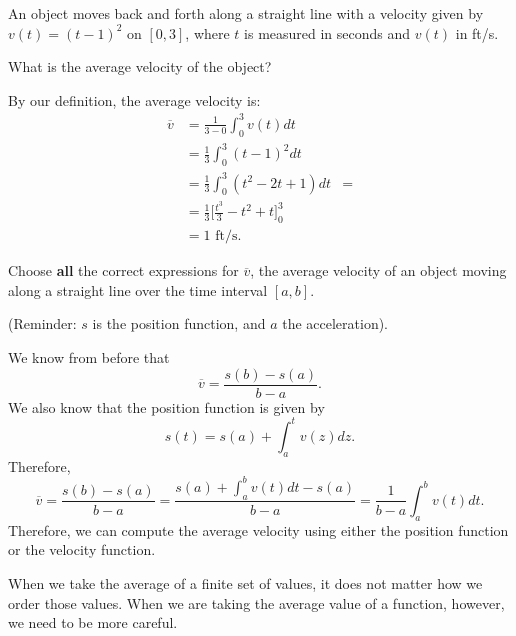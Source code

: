\documentclass{ximera}
\begin{document}
\begin{example}
An object moves back and forth along a straight line with a velocity
given by $v(t) = (t-1)^2$ on $[0,3]$, where $t$ is measured in seconds
and $v(t)$ in ft/s.

What is the average velocity of the object?
\begin{explanation}
By our definition, the average velocity is:
\begin{align*}
\overline{v}&=\frac{1}{3-0}\int_0^3v(t) dt\\
&=\frac{1}{3}\int_0^3 (t-1)^2 dt \\
&=\frac13 \int_0^3 (t^2-2t+1) dt&=\\
&= \frac13\bigg[ \frac{t^3}{3}-t^2+t \bigg]_0^3\\
&= 1\text{ ft/s}.
\end{align*}
\end{explanation}
\end{example}
\begin{question}
Choose \textbf{all} the correct expressions for $\overline{v}$, the average velocity of an object moving along a straight line over the time interval $[a,b]$.

(Reminder: $s$ is the position function, and $a$ the acceleration). 
\begin{selectAll}






\end{selectAll}
\begin{feedback}
We know from before that
\[
\overline{v}=\frac{s(b)-s(a)}{b-a}.
\]
We also know that the position function is given by
\[
s(t)=s(a)+\int_a^tv(z) dz.
\]
Therefore,
\[
\overline{v}=\frac{s(b)-s(a)}{b-a}=\frac{s(a)+\int_a^bv(t) dt-s(a)}{b-a}=\frac{1}{b-a}\int_a^bv(t) dt.
\]
Therefore, we can compute the average velocity using either the position function or the velocity function.
\end{feedback}
\end{question}


When we take the average of a finite set of values, it does not matter
how we order those values.  When we are taking the average value of a
function, however, we need to be more careful.
\end{document}
